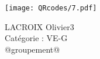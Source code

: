 \documentclass[a4paper,11pt,fleqn]{article}
\begin{document}
\Huge

\begin{block} %
{}\hfill {}



\vspace{1cm}


\begin{minipage}{0.3\linewidth}
\texttt{[image: QRcodes/7.pdf]}
\end{minipage}
{}\hfill {}
\begin{minipage}{0.33\linewidth}
{}\hfill {}
{}\hfill {}


\begin{center}
	LACROIX Olivier3\\
	Catégorie : VE-G\\
	@groupement@
\end{center}

	


\end{minipage}
\end{block}
\end{document}
